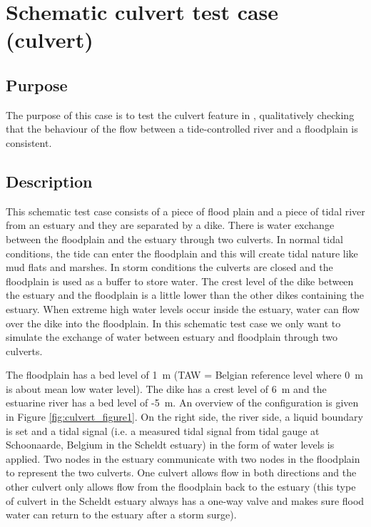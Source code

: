 \chapter{Schematic culvert test case (culvert)}

\section{Purpose}

The purpose of this case is to test the culvert feature in ,
qualitatively checking that
the behaviour of the flow between a tide-controlled river and a floodplain is
consistent.

\section{Description}

This schematic test case consists of a piece of flood plain and a piece of tidal
river from an estuary and they are separated by a dike.
There is water exchange between the floodplain and the estuary through two culverts.
In normal tidal conditions, the tide can enter the floodplain and this will
create tidal nature like mud flats and marshes.
In storm conditions the culverts are closed and the floodplain is used as a
buffer to store water.
The crest level of the dike between the estuary and the floodplain is a little
lower than the other dikes containing the estuary.
When extreme high water levels occur inside the estuary, water can flow over
the dike into the floodplain.
In this schematic test case we only want to simulate the exchange of water
between estuary and floodplain through two culverts.

The floodplain has a bed level of 1~m (TAW = Belgian reference level where 0~m
is about mean low water level).
The dike has a crest level of 6~m and the estuarine river has a bed level of -5~m.
An overview of the configuration is given in Figure \ref{fig:culvert_figure1}.
On the right side, the river side, a liquid boundary is set and a tidal signal
(i.e. a measured tidal signal from tidal gauge at Schoonaarde, Belgium in the
Scheldt estuary)
in the form of water levels is applied.
Two nodes in the estuary communicate with two nodes in the floodplain to
represent the two culverts.
One culvert allows flow in both directions and the other culvert only allows
flow from the floodplain back to the estuary
(this type of culvert in the Scheldt estuary always has a one-way valve and
makes sure flood water can return to the estuary after a storm surge).

